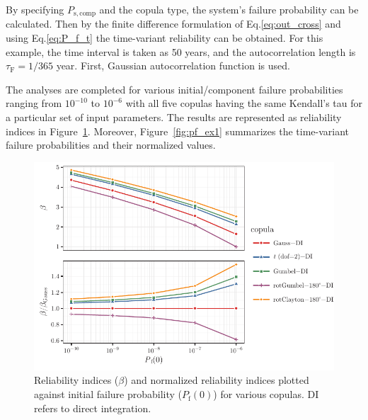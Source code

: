 By specifying $P_\mathrm{s,comp}$ and the copula type, the system's failure probability can be calculated. Then by the finite difference formulation of Eq.\ref{eq:out_cross} and using Eq.\ref{eq:P_f_t} the time-variant reliability can be obtained. For this example, the time interval is taken as 50 years, and the autocorrelation length is $\tau_\mathrm{F} = 1/365$ year. First, Gaussian autocorrelation function is used.

The analyses are completed for various initial/component failure probabilities ranging from $10^{-10}$ to $10^{-6}$ with all five copulas having the same Kendall's tau for a particular set of input parameters. The results are represented as reliability indices in Figure~\ref{fig:beta_ex1}. Moreover, Figure~\ref{fig:pf_ex1} summarizes the time-variant failure probabilities and their normalized values.

\begin{figure}[htbp!] 
	\centering    
	\includegraphics[]{simple_example_beta.pdf}
	\caption{Reliability indices ($\beta$) and normalized reliability indices plotted against initial failure probability ($P_\mathrm{f}(0)$) for various copulas. DI refers to direct integration.}
	\label{fig:beta_ex1}
\end{figure}

